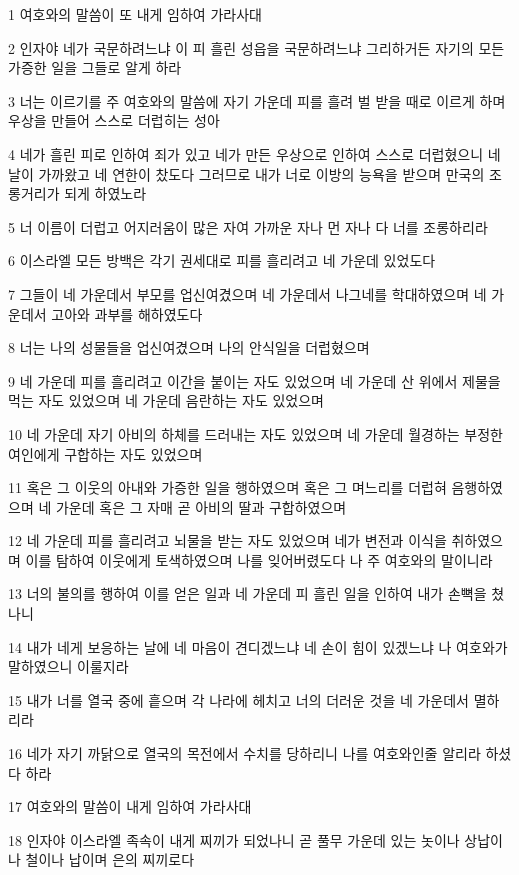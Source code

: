 \par 1 여호와의 말씀이 또 내게 임하여 가라사대
\par 2 인자야 네가 국문하려느냐 이 피 흘린 성읍을 국문하려느냐 그리하거든 자기의 모든 가증한 일을 그들로 알게 하라
\par 3 너는 이르기를 주 여호와의 말씀에 자기 가운데 피를 흘려 벌 받을 때로 이르게 하며 우상을 만들어 스스로 더럽히는 성아
\par 4 네가 흘린 피로 인하여 죄가 있고 네가 만든 우상으로 인하여 스스로 더럽혔으니 네 날이 가까왔고 네 연한이 찼도다 그러므로 내가 너로 이방의 능욕을 받으며 만국의 조롱거리가 되게 하였노라
\par 5 너 이름이 더럽고 어지러움이 많은 자여 가까운 자나 먼 자나 다 너를 조롱하리라
\par 6 이스라엘 모든 방백은 각기 권세대로 피를 흘리려고 네 가운데 있었도다
\par 7 그들이 네 가운데서 부모를 업신여겼으며 네 가운데서 나그네를 학대하였으며 네 가운데서 고아와 과부를 해하였도다
\par 8 너는 나의 성물들을 업신여겼으며 나의 안식일을 더럽혔으며
\par 9 네 가운데 피를 흘리려고 이간을 붙이는 자도 있었으며 네 가운데 산 위에서 제물을 먹는 자도 있었으며 네 가운데 음란하는 자도 있었으며
\par 10 네 가운데 자기 아비의 하체를 드러내는 자도 있었으며 네 가운데 월경하는 부정한 여인에게 구합하는 자도 있었으며
\par 11 혹은 그 이웃의 아내와 가증한 일을 행하였으며 혹은 그 며느리를 더럽혀 음행하였으며 네 가운데 혹은 그 자매 곧 아비의 딸과 구합하였으며
\par 12 네 가운데 피를 흘리려고 뇌물을 받는 자도 있었으며 네가 변전과 이식을 취하였으며 이를 탐하여 이웃에게 토색하였으며 나를 잊어버렸도다 나 주 여호와의 말이니라
\par 13 너의 불의를 행하여 이를 얻은 일과 네 가운데 피 흘린 일을 인하여 내가 손뼉을 쳤나니
\par 14 내가 네게 보응하는 날에 네 마음이 견디겠느냐 네 손이 힘이 있겠느냐 나 여호와가 말하였으니 이룰지라
\par 15 내가 너를 열국 중에 흩으며 각 나라에 헤치고 너의 더러운 것을 네 가운데서 멸하리라
\par 16 네가 자기 까닭으로 열국의 목전에서 수치를 당하리니 나를 여호와인줄 알리라 하셨다 하라
\par 17 여호와의 말씀이 내게 임하여 가라사대
\par 18 인자야 이스라엘 족속이 내게 찌끼가 되었나니 곧 풀무 가운데 있는 놋이나 상납이나 철이나 납이며 은의 찌끼로다
